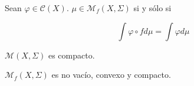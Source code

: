 \begin{lema}\label{lema3_krylov}
	Sean $\varphi \in \mathcal{C}(X)$. $\mu \in \mathcal{M}_f(X,\Sigma)$ si y sólo si
	
	\begin{equation}
		\int \varphi \circ f d\mu = \int \varphi d\mu
	\end{equation}
\end{lema}

\begin{lema}
	$\mathcal{M}(X,\Sigma)$ es compacto. 
\end{lema}

\begin{teorema}
	$\mathcal{M}_f(X,\Sigma)$ es no vacío, convexo y compacto.
\end{teorema}

